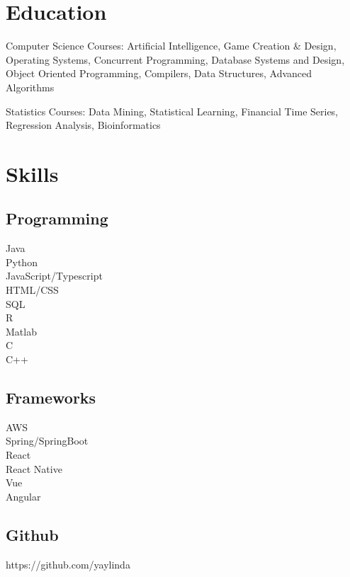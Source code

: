 \documentclass[letterpaper]{deedy-resume-openfont} %
\begin{document}
\sectionsep %


\section{Education}
\sectionheadersep


\begin{tightemize}
\item Computer Science Courses: Artificial Intelligence, Game Creation \& Design, Operating Systems, Concurrent Programming, Database Systems and Design, Object Oriented Programming, Compilers, Data Structures, Advanced Algorithms
\item Statistics Courses: Data Mining, Statistical Learning, Financial Time Series, Regression Analysis, Bioinformatics
\end{tightemize}

\sectionsep %


\section{Skills}
\sectionheadersep

\subsection{Programming}

\textbullet{} Java\\
\textbullet{} Python\\
\textbullet{} JavaScript/Typescript\\
\textbullet{} HTML/CSS\\
\textbullet{} SQL\\
\textbullet{} R\\
\textbullet{} Matlab\\
\textbullet{} C\\
\textbullet{} C++

\sectionsep %

\subsection{Frameworks}
\textbullet{} AWS\\
\textbullet{} Spring/SpringBoot\\
\textbullet{} React\\
\textbullet{} React Native\\
\textbullet{} Vue\\
\textbullet{} Angular\\

\sectionsep %

\subsection{Github}
\textbullet{} https://github.com/yaylinda
\end{document}
